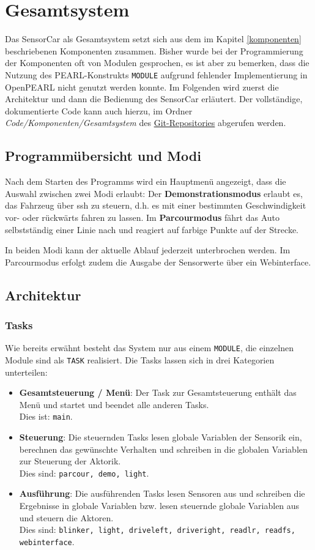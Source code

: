 \chapter{Gesamtsystem}
Das SensorCar als Gesamtsystem setzt sich aus dem im Kapitel \ref{komponenten} beschriebenen Komponenten zusammen. Bisher wurde bei der Programmierung der Komponenten oft von Modulen gesprochen, es ist aber zu bemerken, dass die Nutzung des PEARL-Konstrukts \texttt{MODULE} aufgrund fehlender Implementierung in OpenPEARL nicht genutzt werden konnte. Im Folgenden wird zuerst die Architektur und dann die Bedienung des SensorCar erläutert. Der vollständige, dokumentierte Code kann auch hierzu, im Ordner \emph{Code/Komponenten/Gesamtsystem} des \href{https://github.com/OpenPearl-HFUWPV1718/SensorCar}{Git-Repositories} abgerufen werden.

\section{Programmübersicht und Modi}
Nach dem Starten des Programms wird ein Hauptmenü angezeigt, dass die Auswahl zwischen zwei Modi erlaubt:
Der \textbf{Demonstrationsmodus} erlaubt es, das Fahrzeug über ssh zu steuern, d.h. es mit einer bestimmten Geschwindigkeit vor- oder rückwärts fahren zu lassen.
Im \textbf{Parcourmodus} fährt das Auto selbstständig einer Linie nach und reagiert auf farbige Punkte auf der Strecke.

In beiden Modi kann der aktuelle Ablauf jederzeit unterbrochen werden. Im Parcourmodus erfolgt zudem die Ausgabe der Sensorwerte über ein Webinterface.  

\section{Architektur}
\subsection{Tasks}
Wie bereits erwähnt besteht das System nur aus einem \texttt{MODULE}, die einzelnen Module sind als \texttt{TASK} realisiert. Die Tasks lassen sich in drei Kategorien unterteilen:
\begin{itemize}
	\item \textbf{Gesamtsteuerung / Menü}: Der Task zur Gesamtsteuerung enthält das Menü und startet und beendet alle anderen Tasks.\\
	Dies ist: \texttt{main}.
	\item \textbf{Steuerung}: Die steuernden Tasks lesen globale Variablen der Sensorik ein, berechnen das gewünschte Verhalten und schreiben in die globalen Variablen zur Steuerung der Aktorik. \\
	Dies sind: \texttt{parcour, demo, light}.
	\item \textbf{Ausführung}: Die ausführenden Tasks lesen Sensoren aus und schreiben die Ergebnisse in globale Variablen bzw. lesen steuernde globale Variablen aus und steuern die Aktoren.\\
	Dies sind: \texttt{blinker, light, driveleft, driveright, readlr, readfs, webinterface}.
\end{itemize}

